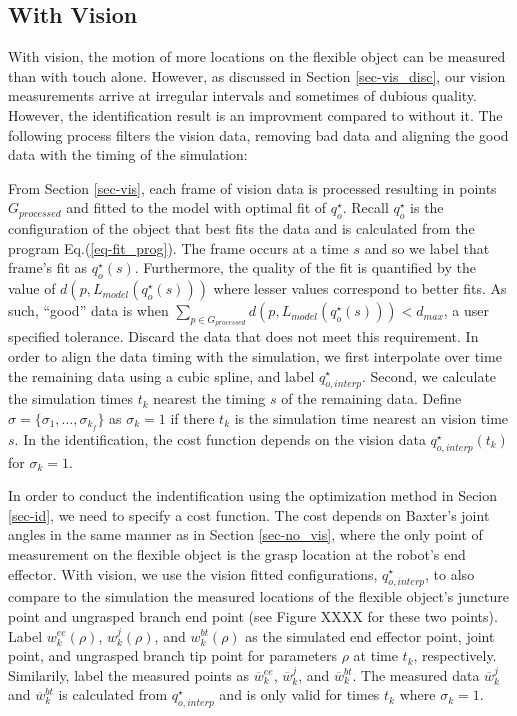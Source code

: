 \documentclass[runningheads,a4paper]{llncs}
\begin{document}
\subsection{With Vision \label{sec-w_vis}}
With vision, the motion of more locations on the flexible object can be measured than with touch alone. However, as discussed in Section \ref{sec-vis_disc}, our vision measurements arrive at irregular intervals and sometimes of dubious quality. However, the identification result is an improvment compared to without it. The following process filters the vision data, removing bad data and aligning the good data with the timing of the simulation:

From Section \ref{sec-vis}, each frame of vision data is processed resulting in points $G_{processed}$ and fitted to the model with optimal fit of $q_o^\star$. Recall $q_o^\star$ is the configuration of the object that best fits the data and is calculated from the program Eq.(\ref{eq-fit_prog}). The frame occurs at a time $s$ and so we label that frame's fit as $q_o^\star(s)$.  Furthermore, the quality of the fit is quantified by the value of $d(p,L_{model}(q_o^\star(s)))$ where lesser values correspond to better fits.  As such, ``good'' data is when $\sum_{p\in G_{processed}}d(p,L_{model}(q_o^\star(s)))<d_{max}$, a user specified tolerance. Discard the data that does not meet this requirement.  In order to align the data timing with the simulation, we first interpolate over time the remaining data using a cubic spline, and label $q_{o,interp}^\star$.  Second, we calculate the simulation times $t_k$ nearest the timing $s$ of the remaining data. Define $\sigma = \{\sigma_1,\ldots,\sigma_{k_f}\}$ as $\sigma_k = 1$ if there $t_k$ is the simulation time nearest an vision time $s$.  In the identification, the cost function depends on the vision data $q_{o,interp}^\star(t_k)$ for $\sigma_k = 1$.

In order to conduct the indentification using the optimization method in Secion \ref{sec-id}, we need to specify a cost function.  The cost depends on Baxter's joint angles in the same manner as in Section \ref{sec-no_vis}, where the only point of measurement on the flexible object is the grasp location at the robot's end effector. With vision, we use the vision fitted configurations, $q_{o,interp}^\star$, to also compare to the simulation the measured locations of the flexible object's juncture point and ungrasped branch end point (see Figure XXXX for these two points). Label $w_k^{ee}(\rho)$, $w_k^j (\rho)$, and $w_k^{bt}(\rho)$ as the simulated end effector point, joint point, and ungrasped branch tip point for parameters $\rho$ at time $t_k$, respectively. Similarily, label the measured points as $\overline{w}_k^{ee}$, $\overline{w}_k^j$, and $\overline{w}_k^{bt}$. The measured data $\overline{w}_k^{j}$ and $\overline{w}_k^{bt}$ is calculated from $q_{o,interp}^\star$ and is only valid for times $t_k$ where $\sigma_k = 1$.  
\end{document}
